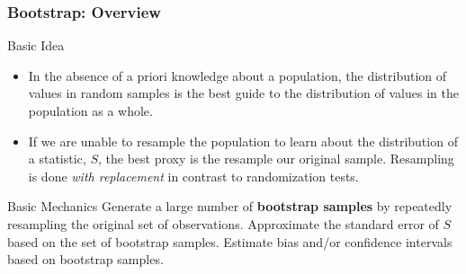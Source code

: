 \documentclass{beamer}
\begin{document}
\begin{frame}
  \frametitle{Bootstrap: Overview}
  
\begin{block}{Basic Idea}
\begin{itemize}
    \item In the absence of a priori knowledge about a population, the distribution of values in random samples is the best guide to the distribution of values in the population as a whole.

    \item If we are unable to resample the population to learn about the distribution of a statistic, $S$, the best proxy is the resample our original sample. Resampling is done \emph{with replacement} in contrast to randomization tests.
\end{itemize}
\end{block}


\begin{block}{Basic Mechanics}
Generate a large number of \textbf{bootstrap samples} by repeatedly resampling the original set of observations.  Approximate the standard error of $S$ based on the set of bootstrap samples. Estimate bias and/or confidence intervals based on bootstrap samples.

\end{block}

  

\end{frame}
\end{document}
